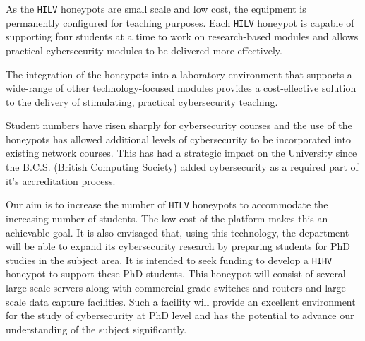 \documentclass[10pt,journal]{IEEEtran}
\begin{document}
As the \texttt{HILV} honeypots are small scale and low cost, the equipment is
permanently configured for teaching purposes. Each \texttt{HILV} honeypot is
capable of supporting four students at a time to work on research-based modules
and allows practical cybersecurity modules to be delivered more effectively.

The integration of the honeypots into a laboratory environment that supports
a wide-range of other technology-focused modules provides a cost-effective
solution to the delivery of stimulating, practical cybersecurity teaching.

Student numbers have risen sharply for cybersecurity courses and the
use of the honeypots has allowed additional levels of cybersecurity to be
incorporated into existing network courses. This has had a strategic impact on
the University since the B.C.S. (British Computing Society) added
cybersecurity as a required part of it's accreditation process.

Our aim is to increase the number of \texttt{HILV} honeypots to accommodate the
increasing number of students. The low cost of the platform makes this an
achievable goal. It is also envisaged that, using this technology, the
department will be able to expand its cybersecurity research by preparing
students for PhD studies in the subject area. It is intended to seek funding to
develop a \texttt{HIHV} honeypot to support these PhD students. This honeypot
will consist of several large scale servers along with commercial grade
switches and routers and large-scale data capture facilities. Such a facility
will provide an excellent environment for the study of cybersecurity at PhD
level and has the potential to advance our understanding of the subject
significantly.




\end{document}
